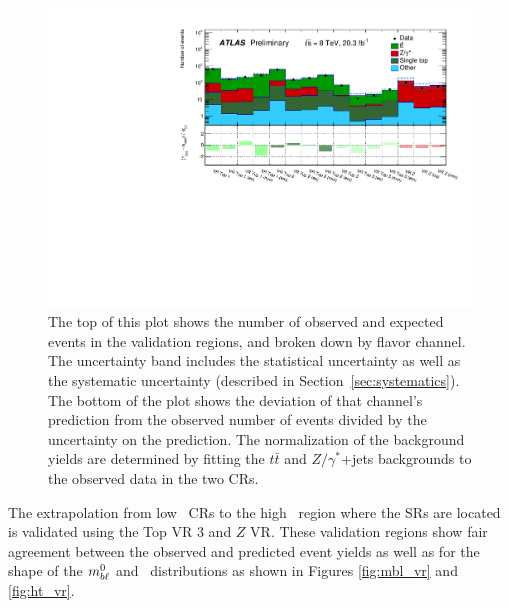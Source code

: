 \begin{figure}[ht]
\centering
\includegraphics[width=\textwidth]{figs/blstop/histpull_VR_detailed.pdf}
\caption{The top of this plot shows the number of observed and expected
  events in the validation regions, and broken down by flavor channel.
  The uncertainty band includes the statistical uncertainty as well as the
  systematic uncertainty (described in Section~\ref{sec:systematics}). The
  bottom of the plot shows the deviation of that channel's prediction
  from the observed number of events divided by the uncertainty on the
  prediction. The normalization of the background yields are determined
  by fitting the $t\bar{t}$ and $Z/\gamma^{*}$+jets backgrounds to the observed
  data in the two CRs.
}
\label{fig:pull_dist_vr}
\end{figure}

The extrapolation from low \HT\ CRs to the high \HT\ region
where the SRs are located is validated using the Top VR 3
and $Z$ VR. These validation regions show fair
agreement between the observed and predicted event yields as well as
for the shape of the $m_{b\ell}^{0}$ and \HT\ distributions as shown in
Figures \ref{fig:mbl_vr} and \ref{fig:ht_vr}.

